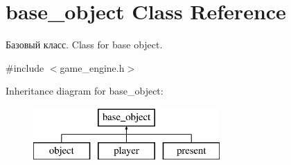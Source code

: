 \hypertarget{classbase__object}{}\section{base\+\_\+object Class Reference}
\label{classbase__object}


Базовый класс. Class for base object.  




{\ttfamily \#include $<$game\+\_\+engine.\+h$>$}

Inheritance diagram for base\+\_\+object\+:\begin{figure}[H]
\begin{center}
\leavevmode
\includegraphics[height=2.000000cm]{classbase__object}
\end{center}
\end{figure}
